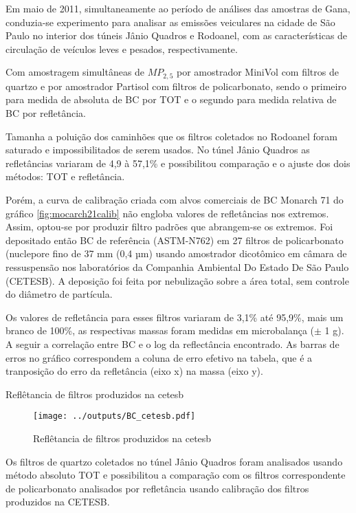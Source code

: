 Em maio de 2011, simultaneamente ao período de análises das amostras de Gana,
conduzia-se experimento para analisar as emissões veiculares na cidade de São 
Paulo no interior dos túneis Jânio Quadros e Rodoanel, com as características
de circulação de veículos leves e pesados, respectivamente. 

Com amostragem simultâneas de $MP_{2,5}$ por amostrador MiniVol com 
filtros de quartzo e por amostrador Partisol com filtros de policarbonato, 
sendo o primeiro para medida de absoluta de BC por TOT e o segundo para medida
relativa de BC por refletância.

Tamanha a poluição dos caminhões que os filtros coletados no Rodoanel 
foram saturado e impossibilitados de serem usados. No túnel Jânio Quadros
as refletâncias variaram de 4,9 à 57,1\% e possibilitou comparação e o 
ajuste dos dois métodos: TOT e refletância.

Porém, a curva de calibração criada com alvos comerciais de BC Monarch 71
do gráfico \ref{fig:mocarch21calib} não engloba valores de refletâncias 
nos extremos.
Assim, optou-se por produzir filtro padrões que abrangem-se os extremos.   
Foi depositado então BC de referência (ASTM-N762) em 27 filtros de policarbonato
(nuclepore fino de 37 mm (0,4 µm) usando amostrador dicotômico em câmara de 
ressuspensão nos laboratórios da 
Companhia Ambiental Do Estado De São Paulo (CETESB). A deposição foi feita por 
nebulização sobre a área total, sem controle do diâmetro de partícula.

Os valores de refletância para esses filtros variaram de 3,1\% até 95,9\%, 
mais um branco de 100\%, as respectivas massas foram medidas em microbalança 
($\pm$ 1 g). A seguir a correlação entre BC e o log da reflectância encontrado.
As barras de erros no gráfico correspondem a coluna de erro efetivo na tabela, 
que é a tranposição do erro da refletância (eixo x) na massa (eixo y). 

\newpage
\begin{table}[H]
  \centering
  \small
    
    \caption{Reflêtancia de filtros produzidos na cetesb}
\end{table} 

\begin{figure}[H]
  \centering
  \texttt{[image: ../outputs/BC\_cetesb.pdf]}
  \caption{Reflêtancia de filtros produzidos na cetesb}
\end{figure}
\newpage

Os filtros de quartzo coletados no túnel Jânio Quadros foram analisados usando
método absoluto TOT e possibilitou a comparação com os filtros correspondente 
de policarbonato analisados por refletância usando calibração dos filtros
produzidos na CETESB. 

